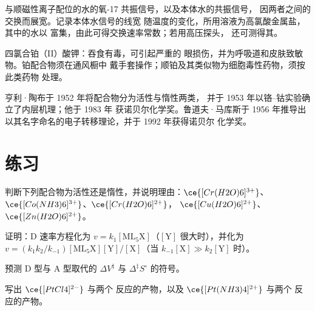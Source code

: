 \begin{inthelab}[氧-17 核磁共振测定水交换]
与顺磁性离子配位的水的氧-17 共振信号，以及本体水的共振信号，
因两者之间的交换而展宽。记录本体水信号的线宽
随温度的变化，所用溶液为高氯酸金属盐，
其中的水以  富集，由此可得交换速率常数；若用高压探头，
还可测得其。
\end{inthelab}

\begin{safety}{}
四氯合铂（II）酸钾：吞食有毒，可引起严重的
眼损伤，并为呼吸道和皮肤致敏物。铂配合物须在通风橱中
戴手套操作；顺铂及其类似物为细胞毒性药物，须按此类药物
处理。
\end{safety}

\begin{history}[陶布与马库斯]
亨利·陶布于 1952 年将配合物分为活性与惰性两类，
并于 1953 年以铬–钴实验确立了内层机理；他于 1983 年
获诺贝尔化学奖。鲁道夫·马库斯于 1956 年推导出
以其名字命名的电子转移理论，并于 1992 年获得诺贝尔
化学奖。
\end{history}

\section{练习}

\begin{exercise}[$\star$]\label{exo:b3:complex-mechanisms:1}
判断下列配合物为活性还是惰性，并说明理由：$\ce{[Cr(H2O)6]^{3+}}$、$\ce{[Co(NH3)6]^{3+}}$、$\ce{[Cr(H2O)6]^{2+}}$，
$\ce{[Cu(H2O)6]^{2+}}$、$\ce{[Zn(H2O)6]^{2+}}$。
\end{exercise}

\begin{exercise}[$\star$]\label{exo:b3:complex-mechanisms:2}
证明：D 速率方程化为 $v = k_1[\mathrm{ML_5X}]$（$[\mathrm Y]$ 很大时），并化为 $v = (k_1k_2/k_{-1})
[\mathrm{ML_5X}][\mathrm Y]/[\mathrm X]$（当 $k_{-1}[\mathrm X] \gg k_2[\mathrm Y]$ 时）。
\end{exercise}

\begin{exercise}[$\star$]\label{exo:b3:complex-mechanisms:3}
预测 D 型与 A 型取代的 $\Delta V^{\ddagger}$ 与 $\Delta^{\ddagger}S^\circ$ 的符号。
\end{exercise}

\begin{exercise}[$\star$]\label{exo:b3:complex-mechanisms:4}
写出 $\ce{[PtCl4]^{2-}}$ 与两个  反应的产物，以及 $\ce{[Pt(NH3)4]^{2+}}$ 与两个  反应的产物。
\end{exercise}

